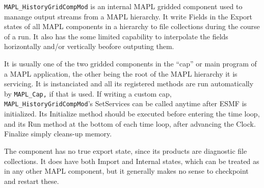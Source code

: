 %  
%  
%  
%
%

{\tt MAPL\_HistoryGridCompMod} is an internal MAPL gridded component
used to manange output streams from a MAPL hierarchy. It write Fields
in the Export states of all MAPL components in a hierarchy to file
collections during the course of a run. It also has the some limited
capability to interpolate the fields horizontally and/or vertically
beofore outputing them.

It is usually one of the two gridded components in the ``cap'' or main
program of a MAPL application, the other being the root of the MAPL
hierarchy it is servicing. It is instanciated and all its registered
methods are run automatically by {\tt MAPL\_Cap,} if that is used.  If
writing a custom cap, {\tt MAPL\_HistoryGridCompMod}'s SetServices can
be called anytime after ESMF is initialized.  Its Initialize method
should be executed before entering the time loop, and its Run method
at the bottom of each time loop, after advancing the Clock. Finalize
simply cleans-up memory.

The component has no true export state, since its products are
diagnostic file collections. It does have both Import and Internal
states, which can be treated as in any other MAPL component, but it
generally makes no sense to checkpoint and restart these.

